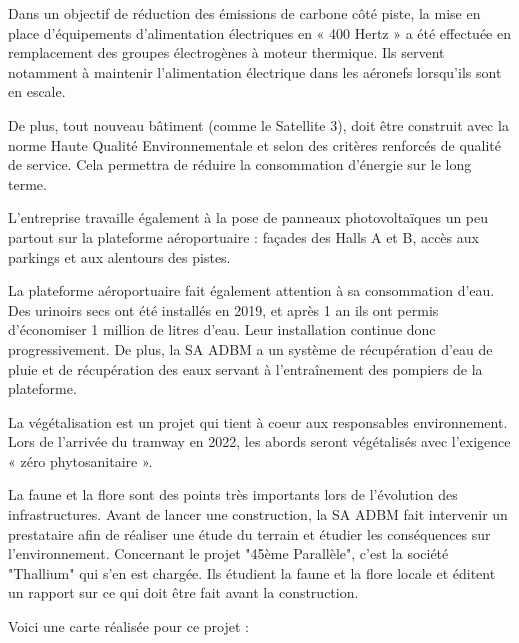 Dans un objectif de réduction des émissions de carbone côté piste, la mise en place d’équipements d’alimentation électriques en « 400 Hertz » a été effectuée en remplacement des groupes électrogènes à moteur thermique. Ils servent notamment à maintenir l'alimentation électrique dans les aéronefs lorsqu'ils sont en escale.


De plus, tout nouveau bâtiment (comme le Satellite 3), doit être construit avec la norme Haute Qualité Environnementale et selon des critères renforcés de qualité de service. Cela permettra de réduire la consommation d'énergie sur le long terme.\newline


L'entreprise travaille également à la pose de panneaux photovoltaïques un peu partout sur la plateforme aéroportuaire : façades des Halls A et B, accès aux parkings et aux alentours des pistes.\newline


La plateforme aéroportuaire fait également attention à sa consommation d'eau. Des urinoirs secs ont été installés en 2019, et après 1 an ils ont permis d'économiser 1 million de litres d'eau. Leur installation continue donc progressivement.
De plus, la SA ADBM a un système de récupération d'eau de pluie et de récupération des eaux servant à l'entraînement des pompiers de la plateforme.\newline


La végétalisation est un projet qui tient à coeur aux responsables environnement. Lors de l'arrivée du tramway en 2022, les abords seront végétalisés avec l'exigence « zéro phytosanitaire ».\newline


La faune et la flore sont des points très importants lors de l'évolution des infrastructures. Avant de lancer une construction, la SA ADBM fait intervenir un prestataire afin de réaliser une étude du terrain et étudier les conséquences sur l'environnement.
Concernant le projet "45ème Parallèle", c'est la société "Thallium" qui s'en est chargée. Ils étudient la faune et la flore locale et éditent un rapport sur ce qui doit être fait avant la construction.\newline

Voici une carte réalisée pour ce projet :

